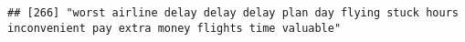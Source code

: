 \documentclass[
]{article}
\begin{document}
\begin{verbatim}
## [266] "worst airline delay delay delay plan day flying stuck hours inconvenient pay extra money flights time valuable"                                                                                                                                                                                                                                                                                                                                                                                                                                                                                                                                                                                                                                                                                                                                                                                                                                                                                                                                                                                                                                                                                                                                                                                                                                                                                                                                                                                                                                                                                                                                                                                                                                                                                

\end{verbatim}
\end{document}
